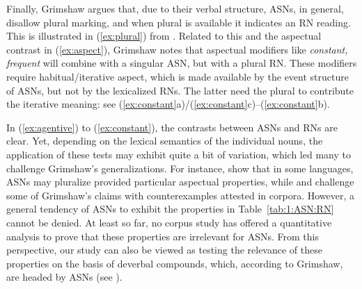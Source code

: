\documentclass[output=paper]{langsci/langscibook}
\begin{document}
 {Finally, Grimshaw argues that, due to their verbal structure, ASNs, in general, disallow plural marking, and when plural is available it indicates an RN reading. This is illustrated in (\ref{ex:plural}) from \citet[54]{grimshaw:90}. Related to this and the aspectual contrast in (\ref{ex:aspect}), Grimshaw notes that aspectual modifiers like \textit{constant, frequent} will combine with a singular ASN, but with a plural RN. These modifiers require habitual/iterative aspect, which is made available by the event structure of ASNs, but not by the lexicalized RNs. The latter need the plural to contribute the iterative meaning: see (\ref{ex:constant}a)/(\ref{ex:constant}c)--(\ref{ex:constant}b).}

\begin{exe}
\end{exe}

\begin{exe}
\end{exe}

 {In (\ref{ex:agentive}) to (\ref{ex:constant}), the contrasts between ASNs and RNs are clear. Yet, depending on the lexical semantics of the individual nouns, the application of these tests may exhibit quite a bit of variation, which led many to challenge Grimshaw's generalizations. For instance, \cite{alexiadou:iordachioaia:soare:10} show that in some languages, ASNs may pluralize provided particular aspectual properties, while  \cite{grimm:mcnally:13} and \cite{lieber:16} challenge some of Grimshaw's claims with counterexamples attested in corpora. However, a general tendency of ASNs to exhibit the properties in Table~\ref{tab:1:ASN:RN} cannot be denied. At least so far, no corpus study has offered a quantitative analysis to prove that these properties are irrelevant for ASNs. From this perspective, our study can also be viewed as testing the relevance of these properties on the basis of deverbal compounds, which, according to Grimshaw, are headed by ASNs (see ).}
\end{document}

